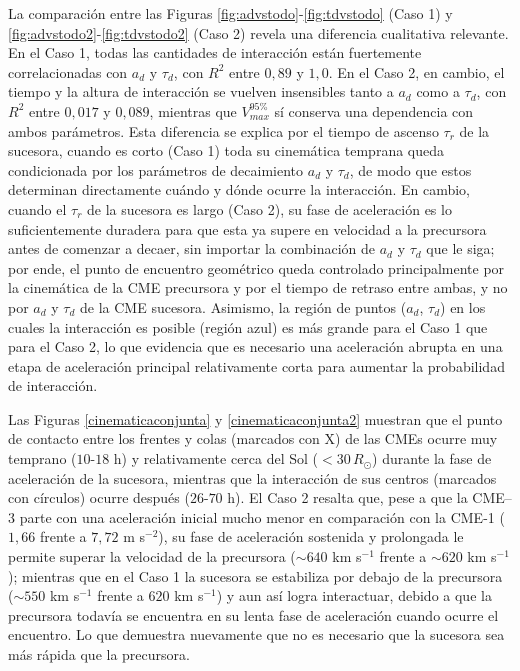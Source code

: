 La comparación entre las Figuras \ref{fig:advstodo}-\ref{fig:tdvstodo} (Caso 1) y \ref{fig:advstodo2}-\ref{fig:tdvstodo2} (Caso 2) revela una diferencia cualitativa relevante. En el Caso 1, todas las cantidades de interacción están fuertemente correlacionadas con $a_d$ y $\tau_d$, con $R^{2}$ entre $0{,}89$ y $1{,}0$. En el Caso 2, en cambio, el tiempo y la altura de interacción se vuelven insensibles tanto a $a_d$ como a $\tau_d$, con $R^{2}$ entre $0{,}017$ y $0{,}089$, mientras que $V_{max}^{95\%}$ sí conserva una dependencia con ambos parámetros. Esta diferencia se explica por el tiempo de ascenso $\tau_r$ de la sucesora, cuando es corto (Caso 1) toda su cinemática temprana queda condicionada por los parámetros de decaimiento $a_d$ y $\tau_d$, de modo que estos determinan directamente cuándo y dónde ocurre la interacción. En cambio, cuando el $\tau_r$ de la sucesora es largo (Caso 2), su fase de aceleración es lo suficientemente duradera para que esta ya supere en velocidad a la precursora antes de comenzar a decaer, sin importar la combinación de $a_d$ y $\tau_d$ que le siga; por ende, el punto de encuentro geométrico queda controlado principalmente por la cinemática de la CME precursora y por el tiempo de retraso entre ambas, y no por $a_d$ y $\tau_d$ de la CME sucesora. Asimismo, la región de puntos ($a_d$, $\tau_d$) en los cuales la interacción es posible (región azul) es más grande para el Caso 1 que para el Caso 2, lo que evidencia que es necesario una aceleración abrupta en una etapa de aceleración principal relativamente corta para aumentar la probabilidad de interacción.

Las Figuras \ref{cinematicaconjunta} y \ref{cinematicaconjunta2} muestran que el punto de contacto entre los frentes y colas (marcados con X) de las CMEs ocurre muy temprano ($10$-$18$ h) y relativamente cerca del Sol ($<30\,R_\odot$) durante la fase de aceleración de la sucesora, mientras que la interacción de sus centros (marcados con círculos) ocurre después ($26$-$70$ h). El Caso 2 resalta que, pese a que la CME–3 parte con una aceleración inicial mucho menor en comparación con la CME-1 ($1{,}66$ frente a $7{,}72$ m s$^{-2}$), su fase de aceleración sostenida y prolongada le permite superar la velocidad de la precursora ($\sim640$ km s$^{-1}$ frente a $\sim620$ km s$^{-1}$); mientras que en el Caso 1 la sucesora se estabiliza por debajo de la precursora ($\sim550$ km s$^{-1}$ frente a $620$ km s$^{-1}$) y aun así logra interactuar, debido a que la precursora todavía se encuentra en su lenta fase de aceleración cuando ocurre el encuentro. Lo que demuestra nuevamente que no es necesario que la sucesora sea más rápida que la precursora.

